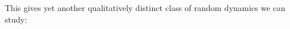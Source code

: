 \documentclass[reprint,prx]{revtex4-1}
\renewcommand{\=}[1]{\stackrel{#1}{=}} %
\renewcommand{\(}{\left (}
\renewcommand{\)}{\right  )}
\renewcommand{\[}{\left [}
\renewcommand{\]}{\right ]}
\newcommand{\<}{\left <}
\renewcommand{\>}{\right >}
\theoremstyle{definition}
\theoremstyle{remark}
\begin{document}
This gives yet another qualitatively distinct class of random dynamics we can study:


%

\end{document}
